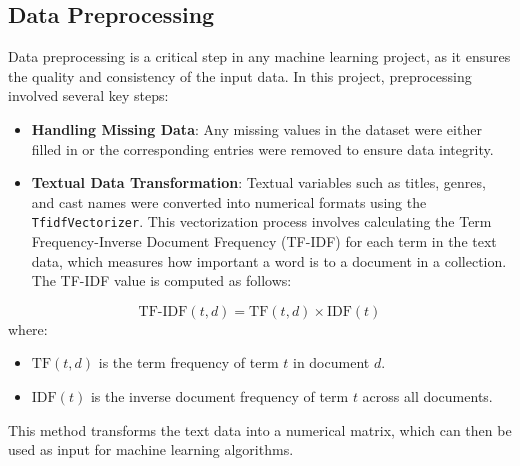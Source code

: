 \documentclass[sigconf]{acmart}
\begin{document}
	\subsection{Data Preprocessing}
	Data preprocessing is a critical step in any machine learning project, as it ensures the quality and consistency of the input data. In this project, preprocessing involved several key steps:
	\begin{itemize}
		\item \textbf{Handling Missing Data}: Any missing values in the dataset were either filled in or the corresponding entries were removed to ensure data integrity.
		\item \textbf{Textual Data Transformation}: Textual variables such as titles, genres, and cast names were converted into numerical formats using the \texttt{TfidfVectorizer}. This vectorization process involves calculating the Term Frequency-Inverse Document Frequency (TF-IDF) for each term in the text data, which measures how important a word is to a document in a collection. The TF-IDF value is computed as follows:
	\end{itemize}
	\begin{equation}
		\text{TF-IDF}(t, d) = \text{TF}(t, d) \times \text{IDF}(t)
	\end{equation}
	where:
	\begin{itemize}
		\item $\text{TF}(t, d)$ is the term frequency of term $t$ in document $d$.
		\item $\text{IDF}(t)$ is the inverse document frequency of term $t$ across all documents.
	\end{itemize}
	This method transforms the text data into a numerical matrix, which can then be used as input for machine learning algorithms.
\end{document}
